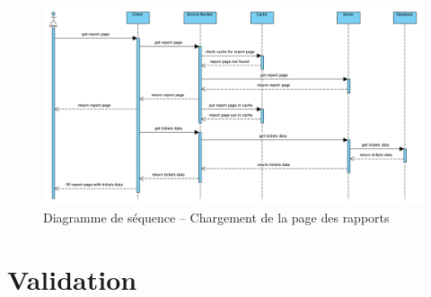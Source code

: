 \documentclass{EPL-master-thesis-covers-FR}
\begin{document}
				\begin{figure}
					\includegraphics[width=\textwidth]{images/sequence}
					\caption{Diagramme de séquence -- Chargement de la page des rapports}
					\label{fig:sequence}
				\end{figure}




	\chapter{Validation}
\end{document}
